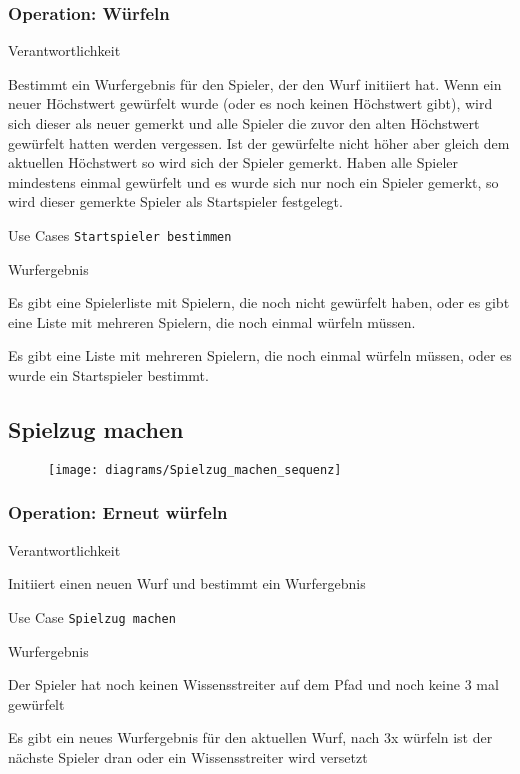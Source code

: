 \subsubsection{Operation: Würfeln}
\begin{labeling}[:]{Verantwortlichkeit}
\item [Verantwortlichkeit] Bestimmt ein Wurfergebnis für den Spieler, der den Wurf initiiert hat. Wenn ein neuer Höchstwert gewürfelt wurde (oder es noch keinen Höchstwert gibt), wird sich dieser als neuer gemerkt und alle Spieler die zuvor den alten Höchstwert gewürfelt hatten werden vergessen. Ist der gewürfelte nicht höher aber gleich dem aktuellen Höchstwert so wird sich der Spieler gemerkt. Haben alle Spieler mindestens einmal gewürfelt und es wurde sich nur noch ein Spieler gemerkt, so wird dieser gemerkte Spieler als Startspieler festgelegt.
\item [Referenzen] Use Cases \texttt{Startspieler bestimmen}
\item [Output] Wurfergebnis
\item [Vorbedingungen] Es gibt eine Spielerliste mit Spielern, die noch nicht gewürfelt haben, oder es gibt eine Liste mit mehreren Spielern, die noch einmal würfeln müssen.
\item [Nachbedingungen] Es gibt eine Liste mit mehreren Spielern, die noch einmal würfeln müssen, oder es wurde ein Startspieler bestimmt.
\end{labeling}

\newpage
\subsection{Spielzug machen}
\begin{figure}[h]
  \begin{center}
    \texttt{[image: diagrams/Spielzug\_machen\_sequenz]}
  \end{center}
\end{figure}

\subsubsection{Operation: Erneut würfeln}
\begin{labeling}[:]{Verantwortlichkeit}
\item [Verantwortlichkeit] Initiiert einen neuen Wurf und bestimmt ein Wurfergebnis
\item [Referenzen] Use Case \texttt{Spielzug machen}
\item [Output] Wurfergebnis
\item [Vorbedingungen] Der Spieler hat noch keinen Wissensstreiter auf dem Pfad und noch keine 3 mal gewürfelt
\item [Nachbedingungen] Es gibt ein neues Wurfergebnis für den aktuellen Wurf, nach 3x würfeln ist der nächste Spieler dran oder ein Wissensstreiter wird versetzt
\end{labeling}

